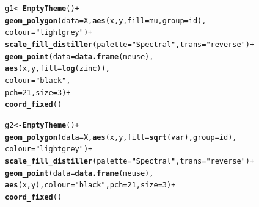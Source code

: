 \documentclass{article}\usepackage[]{graphicx}\usepackage[]{color}
\makeatletter
\newcommand{\hlnum}[1]{\textcolor[rgb]{0.686,0.059,0.569}{#1}}%
\newcommand{\hlstr}[1]{\textcolor[rgb]{0.192,0.494,0.8}{#1}}%
\newcommand{\hlopt}[1]{\textcolor[rgb]{0,0,0}{#1}}%
\newcommand{\hlstd}[1]{\textcolor[rgb]{0.345,0.345,0.345}{#1}}%
\newcommand{\hlkwb}[1]{\textcolor[rgb]{0.69,0.353,0.396}{#1}}%
\newcommand{\hlkwc}[1]{\textcolor[rgb]{0.333,0.667,0.333}{#1}}%
\newcommand{\hlkwd}[1]{\textcolor[rgb]{0.737,0.353,0.396}{\textbf{#1}}}%
\newenvironment{kframe}{%
 \def\at@end@of@kframe{}%
 \ifinner\ifhmode%
  \def\at@end@of@kframe{\end{minipage}}%
  \begin{minipage}{\columnwidth}%
 \fi\fi%
 \def\FrameCommand##1{\hskip\@totalleftmargin \hskip-\fboxsep
 \colorbox{shadecolor}{##1}\hskip-\fboxsep
     \hskip-\linewidth \hskip-\@totalleftmargin \hskip\columnwidth}%
 \MakeFramed {\advance\hsize-\width
   \@totalleftmargin\z@ \linewidth\hsize
   \@setminipage}}%
 {\par\unskip\endMakeFramed%
 \at@end@of@kframe}
\newenvironment{knitrout}{}{} %
\makeatother
\begin{document}
\begin{knitrout}
\begin{kframe}
{\ttfamily\noindent\itshape{}}\begin{alltt}
    \hlstd{g1} \hlkwb{<-} \hlkwd{EmptyTheme}\hlstd{()} \hlopt{+}
        \hlkwd{geom_polygon}\hlstd{(}\hlkwc{data}\hlstd{=X,}\hlkwd{aes}\hlstd{(x,y,}\hlkwc{fill}\hlstd{=mu,}\hlkwc{group}\hlstd{=id),}
                     \hlkwc{colour}\hlstd{=}\hlstr{"light grey"}\hlstd{)} \hlopt{+}
        \hlkwd{scale_fill_distiller}\hlstd{(}\hlkwc{palette}\hlstd{=}\hlstr{"Spectral"}\hlstd{,}\hlkwc{trans}\hlstd{=}\hlstr{"reverse"}\hlstd{)} \hlopt{+}
        \hlkwd{geom_point}\hlstd{(}\hlkwc{data}\hlstd{=}\hlkwd{data.frame}\hlstd{(meuse),}
                   \hlkwd{aes}\hlstd{(x,y,}\hlkwc{fill}\hlstd{=}\hlkwd{log}\hlstd{(zinc)),}
                   \hlkwc{colour}\hlstd{=}\hlstr{"black"}\hlstd{,}
                   \hlkwc{pch}\hlstd{=}\hlnum{21}\hlstd{,} \hlkwc{size}\hlstd{=}\hlnum{3}\hlstd{)} \hlopt{+}
        \hlkwd{coord_fixed}\hlstd{()}

    \hlstd{g2} \hlkwb{<-} \hlkwd{EmptyTheme}\hlstd{()} \hlopt{+}
        \hlkwd{geom_polygon}\hlstd{(}\hlkwc{data}\hlstd{=X,}\hlkwd{aes}\hlstd{(x,y,}\hlkwc{fill}\hlstd{=}\hlkwd{sqrt}\hlstd{(var),}\hlkwc{group}\hlstd{=id),}
                     \hlkwc{colour}\hlstd{=}\hlstr{"light grey"}\hlstd{)} \hlopt{+}
        \hlkwd{scale_fill_distiller}\hlstd{(}\hlkwc{palette}\hlstd{=}\hlstr{"Spectral"}\hlstd{,}\hlkwc{trans}\hlstd{=}\hlstr{"reverse"}\hlstd{)} \hlopt{+}
        \hlkwd{geom_point}\hlstd{(}\hlkwc{data}\hlstd{=}\hlkwd{data.frame}\hlstd{(meuse),}
                   \hlkwd{aes}\hlstd{(x,y),}\hlkwc{colour}\hlstd{=}\hlstr{"black"}\hlstd{,}\hlkwc{pch}\hlstd{=}\hlnum{21}\hlstd{,} \hlkwc{size}\hlstd{=}\hlnum{3}\hlstd{)} \hlopt{+}
        \hlkwd{coord_fixed}\hlstd{()}


\end{alltt}
\end{kframe}
\end{knitrout}
\end{document}
